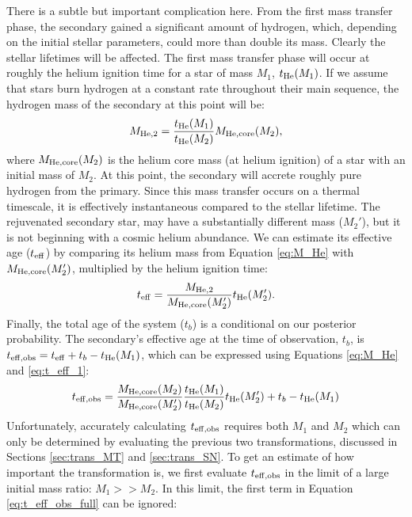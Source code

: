 \documentclass[12pt, preprint]{aastex}
\begin{document}
There is a subtle but important complication here. From the first mass transfer phase, the secondary gained a significant amount of hydrogen, which, depending on the initial stellar parameters, could more than double its mass. Clearly the stellar lifetimes will be affected. The first mass transfer phase will occur at roughly the helium ignition time for a star of mass $M_1$, $t_{\rm He} (M_1)$. If we assume that stars burn hydrogen at a constant rate throughout their main sequence, the hydrogen mass of the secondary at this point will be:
\begin{equation}
M_{\rm He,2} = \frac{t_{\rm He}(M_1)}{t_{\rm He}(M_2)} M_{\rm He,core}(M_2), \label{eq:M_He}
\end{equation}
where $M_{\rm He,core}(M_2)$ is the helium core mass (at helium ignition) of a star with an initial mass of $M_2$. At this point, the secondary will accrete roughly pure hydrogen from the primary. Since this mass transfer occurs on a thermal timescale, it is effectively instantaneous compared to the stellar lifetime. The rejuvenated secondary star, may have a substantially different mass ($M_2'$), but it is not beginning with a cosmic helium abundance. We can estimate its effective age ($t_{\rm eff}$) by comparing its helium mass from Equation \ref{eq:M_He} with $M_{\rm He,core}(M_2')$, multiplied by the helium ignition time:
\begin{equation}
t_{\rm eff} = \frac{M_{\rm He,2}}{M_{\rm He,core} (M_2') } t_{\rm He} (M_2'). \label{eq:t_eff_1}
\end{equation}
Finally, the total age of the system ($t_b$) is a conditional on our posterior probability. The secondary's effective age at the time of observation, $t_b$, is $t_{\rm eff,obs} = t_{\rm eff} + t_b - t_{\rm He}(M_1)$, which can be expressed using Equations \ref{eq:M_He} and \ref{eq:t_eff_1}:
\begin{equation}
t_{\rm eff,obs} = \frac{M_{\rm He,core}(M_2)}{M_{\rm He,core}(M_2')} \frac{t_{\rm He}(M_1)}{t_{\rm He}(M_2)} t_{\rm He}(M_2')
  + t_b - t_{\rm He}(M_1) \label{eq:t_eff_obs_full}
\end{equation}
Unfortunately, accurately calculating $t_{\rm eff,obs}$ requires both $M_1$ and $M_2$ which can only be determined by evaluating the previous two transformations, discussed in Sections \ref{sec:trans_MT} and \ref{sec:trans_SN}. To get an estimate of how important the transformation is, we first evaluate $t_{\rm eff,obs}$ in the limit of a large initial mass ratio: $M_1 >> M_2$. In this limit, the first term in Equation \ref{eq:t_eff_obs_full} can be ignored:
\end{document}
